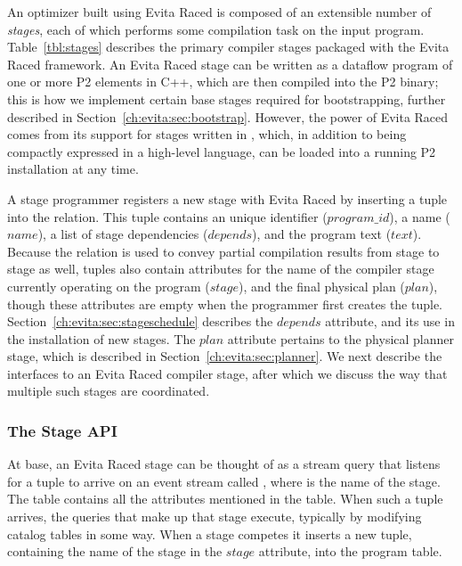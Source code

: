 An optimizer built using Evita Raced is composed of an extensible number of
{\em stages}, each of which performs some compilation task on the input
program.  Table~\ref{tbl:stages} describes the primary compiler stages packaged
with the Evita Raced framework.  An Evita Raced stage can be written as a
dataflow program of one or more P2 elements in C++, which are then compiled
into the P2 binary; this is how we implement certain base stages required for
bootstrapping, further described in Section~\ref{ch:evita:sec:bootstrap}.  However,
the power of Evita Raced comes from its support for stages written in \OVERLOG,
which, in addition to being compactly expressed in a high-level language, can
be loaded into a running P2 installation at any time.

A stage programmer registers a new stage with Evita Raced by inserting a tuple
into the  relation.  This tuple contains an unique identifier
($program\_id$), a name ($name$), a list of stage dependencies ($depends$), and
the program text ($text$).  Because the  relation is used to convey
partial compilation results from stage to stage as well,  tuples
also contain attributes for the name of the compiler stage currently operating
on the program ($stage$), and the final physical plan ($plan$), though these
attributes are empty when the programmer first creates the tuple.
Section~\ref{ch:evita:sec:stageschedule} describes the $depends$ attribute, and
its use in the installation of new stages.  The $plan$ attribute pertains to
the physical planner stage, which is described in
Section~\ref{ch:evita:sec:planner}.  We next describe the interfaces to an
Evita Raced compiler stage, after which we discuss the way that multiple such
stages are coordinated.

\subsubsection{The Stage API}

At base, an Evita Raced stage can be thought of as a stream query that listens
for a tuple to arrive on an event stream called ,
where  is the name of the stage.  The 
table contains all the attributes mentioned in the  table.  When
such a tuple arrives, the queries that make up that stage execute, typically by
modifying catalog tables in some way.  When a stage competes it inserts a new
 tuple, containing the name of the stage in the $stage$ attribute,
into the program table.

